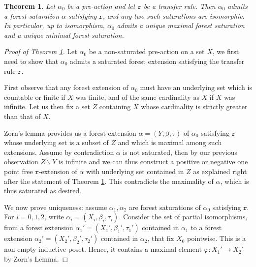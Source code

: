 \documentclass[10pt,a4paper]{amsart}
\newtheorem{theorem}{Theorem}
\newcommand{\trrule}{\mathtt{r}}
\begin{document}
	\begin{theorem}\label{thm: forest saturation ruled}
		Let \( \alpha_0 \) be a pre-action and
		let $\trrule$ be a transfer rule. Then 
		\( \alpha_0 \) admits a forest saturation \( \alpha \) satisfying $\trrule$,
		and any two such saturations are isomorphic.
		In particular, up to isomorphism, \( \alpha_0 \) admits a unique maximal forest saturation and a unique minimal forest saturation.
	\end{theorem}

	\begin{proof}[Proof of Theorem \ref{thm: forest saturation ruled}]
		Let \(\alpha_0\) be a non-saturated pre-action on a set \(X\), we first need to show that 
		\(\alpha_0\) admits a saturated forest extension satisfying the transfer rule \(\trrule \). 
		
		First observe that any forest extension of \(\alpha_0\) must have an underlying set
		which is countable or finite if \(X\) was finite, and of the same cardinality as \(X\)
		if \(X\) was infinite. 
		Let us then fix a set \(Z\) containing \(X\) whose cardinality is strictly greater
		than that of \(X\). 
		
		Zorn's lemma provides us a forest extension \(\alpha=(Y,\beta,\tau)\) of \(\alpha_0\) satisfying \(\trrule\) 
		whose underlying 
		set is a subset of \(Z\) and which is maximal among such extensions. 
		Assume by contradiction \(\alpha\) is not saturated, then by our previous observation 
		\(Z\smallsetminus Y\) is infinite and we can thus construct a positive or negative 
		one point free \( \trrule \)-extension of \(\alpha\) with underlying set contained in \(Z\)
		as explained right after the statement of Theorem \ref{thm: forest saturation ruled}.
		This contradicts the maximality of \(\alpha\), which is thus saturated as desired.

		We now prove uniqueness: assume 
		\( \alpha_1, \alpha_2 \) are forest saturations of \( \alpha_0 \) satisfying \( \trrule \).
		For \( i=0,1,2 \), write \( \alpha_i = (X_i, \beta_i, \tau_i) \).
		Consider the set of partial isomorphisms,
		from a forest extension \( \alpha_1' = (X_1',\beta_1',\tau_1') \) contained in \( \alpha_1 \) 
		to a forest extension \( \alpha_2' = (X_2',\beta_2',\tau_2') \) contained in \( \alpha_2 \),
		that fix \( X_0 \) pointwise.
		This is a non-empty inductive poset.
		Hence, it contains a maximal element \( \varphi:X_1' \to X_2' \) by Zorn's Lemma.
		

\end{proof}
\end{document}
